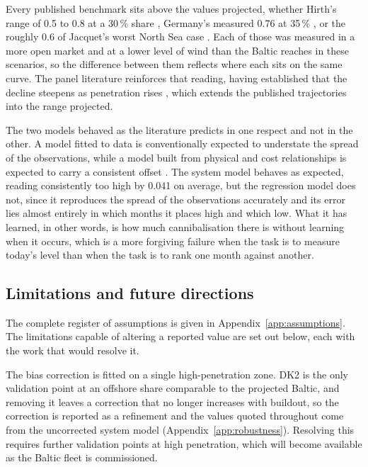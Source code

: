 Every published benchmark sits above the values projected, whether Hirth's
range of 0.5 to 0.8 at a 30\,\% share \cite{Hirth2013}, Germany's measured 0.76
at 35\,\% \cite{Stiewe2025, Ember2025}, or the roughly 0.6 of Jacquet's worst
North Sea case \cite{Jacquet2024}. Each of those was measured in a more open
market and at a lower level of wind than the Baltic reaches in these scenarios,
so the difference between them reflects where each sits on the same curve. The
panel literature reinforces that reading, having established that the decline
steepens as penetration rises \cite{LopezProl2024, Cevik2022}, which extends the
published trajectories into the range projected.

The two models behaved as the literature predicts in one respect and not in the
other. A model fitted to data is conventionally expected to understate the
spread of the observations, while a model built from physical and cost
relationships is expected to carry a consistent offset \cite{Theil1966}. The
system model behaves as expected, reading consistently too high by 0.041 on
average, but the regression model does not, since it reproduces the spread of
the observations accurately and its error lies almost entirely in which months
it places high and which low. What it has learned, in other words, is how much
cannibalisation there is without learning when it occurs, which is a more
forgiving failure when the task is to measure today's level than when the task
is to rank one month against another.

\subsection{Limitations and future directions}\label{sec:conc_limitations}

The complete register of assumptions is given in Appendix~\ref{app:assumptions}.
The limitations capable of altering a reported value are set out below, each
with the work that would resolve it.

The bias correction is fitted on a single high-penetration zone. DK2 is the only
validation point at an offshore share comparable to the projected Baltic, and
removing it leaves a correction that no longer increases with buildout, so the
correction is reported as a refinement and the values quoted throughout
come from the uncorrected system model (Appendix~\ref{app:robustness}).
Resolving this requires further validation points at high penetration, which
will become available as the Baltic fleet is commissioned.

